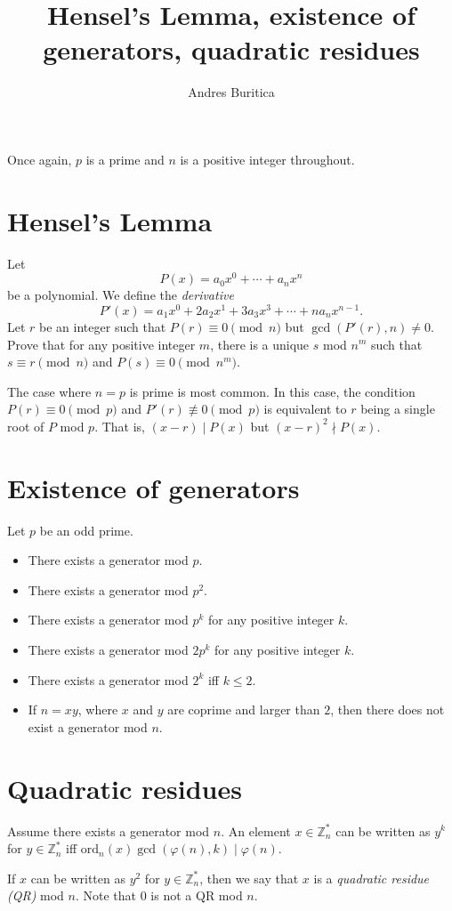 \documentclass{article}
\title{Hensel's Lemma, existence of generators, quadratic residues}
\author{Andres Buritica}
\date{}
\newcommand\Zz{\mathbb{Z}}
\newcommand\ord{\mathrm{ord}}
\begin{document}
\maketitle
Once again, $p$ is a prime and $n$ is a positive integer throughout.
\section{Hensel's Lemma}
Let
\[P(x)=a_0x^0+\cdots+a_n x^n\] be a polynomial. We define the \emph{derivative}
\[P'(x)=a_1 x^0+2a_2 x^1+3a_3 x^3+\cdots+na_n x^{n-1}.\]
Let $r$ be an integer such that $P(r)\equiv 0\pmod n$ but $\gcd(P'(r),n)\ne 0$.
Prove that for any positive integer $m$, there is a unique $s$ mod $n^m$ such
that $s\equiv r\pmod n$ and $P(s)\equiv 0\pmod {n^m}$.

The case where $n=p$ is prime is most common. In this case, the condition
$P(r)\equiv 0\pmod p$ and $P'(r)\not\equiv 0\pmod p$ is equivalent to $r$ being
a single root of $P$ mod $p$. That is, $(x-r)\mid P(x)$ but $(x-r)^2\nmid
P(x)$.
\section{Existence of generators}
Let $p$ be an odd prime.
\begin{itemize}
  \item There exists a generator mod $p$.
  \item There exists a generator mod $p^2$.
  \item There exists a generator mod $p^k$ for any positive integer $k$.
  \item There exists a generator mod $2p^k$ for any positive integer $k$.
  \item There exists a generator mod $2^k$ iff $k\le 2$.
  \item If $n=xy$, where $x$ and $y$ are coprime and larger than $2$, then there
    does not exist a generator mod $n$.
\end{itemize}
\section{Quadratic residues}
Assume there exists a generator mod $n$.
An element $x\in\Zz_n^*$ can be written as $y^k$ for $y\in\Zz_n^*$ iff
$\ord_n(x)\gcd(\varphi(n),k)\mid \varphi(n)$.

If $x$ can be written as $y^2$ for $y\in\Zz_n^*$, then we say that $x$ is a
\emph{quadratic residue (QR)} mod $n$. Note that $0$ is not a QR mod $n$.
\end{document}
